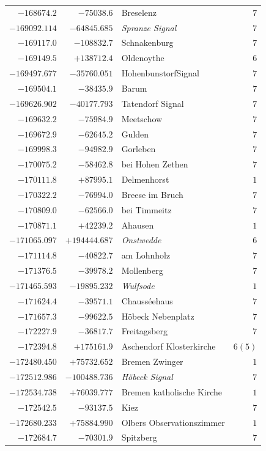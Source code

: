 \begin{center}
\begin{tabular}{r|r|p{170pt}|r}
\(-168674.2\)&\(-75038.6\)&Breselenz&\(7\)\\
\(-169092.114\)&\(-64845.685\)&\textit{Spranze Signal}&\(7\)\\
\(-169117.0\)&\(-108832.7\)&Schnakenburg&\(7\)\\
\(-169149.5\)&\(+138712.4\)&Oldenoythe&\(6\)\\
\(-169497.677\)&\(-35760.051\)&HohenbunstorfSignal&\(7\)\\
\(-169504.1\)&\(-38435.9\)&Barum&\(7\)\\
\(-169626.902\)&\(-40177.793\)&Tatendorf Signal&\(7\)\\
\(-169632.2\)&\(-75984.9\)&Meetschow&\(7\)\\
\(-169672.9\)&\(-62645.2\)&Gulden&\(7\)\\
\(-169998.3\)&\(-94982.9\)&Gorleben&\(7\)\\
\(-170075.2\)&\(-58462.8\)&bei Hohen Zethen&\(7\)\\
\(-170111.8\)&\(+87995.1\)&Delmenhorst&\(1\)\\
\(-170322.2\)&\(-76994.0\)&Breese im Bruch&\(7\)\\
\(-170809.0\)&\(-62566.0\)&bei Timmeitz&\(7\)\\
\(-170871.1\)&\(+42239.2\)&Ahausen&\(1\)\\
\(-171065.097\)&\(+194444.687\)&\textit{Onstwedde}&\(6\)\\
\(-171114.8\)&\(-40822.7\)&am Lohnholz&\(7\)\\
\(-171376.5\)&\(-39978.2\)&Mollenberg&\(7\)\\
\(-171465.593\)&\(-19895.232\)&\textit{Wulfsode}&\(1\)\\
\(-171624.4\)&\(-39571.1\)&Chausséehaus&\(7\)\\
\(-171657.3\)&\(-99622.5\)&Höbeck Nebenplatz&\(7\)\\
\(-172227.9\)&\(-36817.7\)&Freitagsberg&\(7\)\\
\(-172394.8\)&\(+175161.9\)&Aschendorf Klosterkirche&\(6 (5)\)\\
\(-172480.450\)&\(+75732.652\)&Bremen Zwinger&\(1\)\\
\(-172512.986\)&\(-100488.736\)&\textit{Höbeck Signal}&\(7\)\\
\(-172534.738\)&\(+76039.777\)&Bremen katholische Kirche&\(1\)\\
\(-172542.5\)&\(-93137.5\)&Kiez&\(7\)\\
\(-172680.233\)&\(+75884.990\)&Olbers Observationszimmer&\(1\)\\
\(-172684.7\)&\(-70301.9\)&Spitzberg&\(7\)\\
\hline\end{tabular}\endgroup\end{center}
